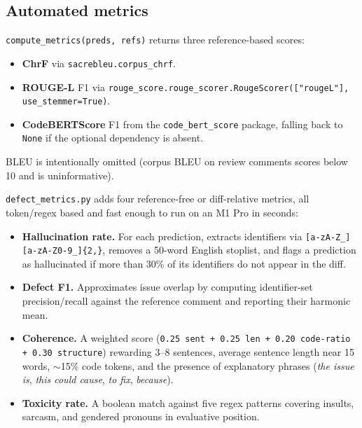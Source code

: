 \documentclass[11pt,a4paper]{article}
\newcommand{\code}[1]{\texttt{\small #1}}
\begin{document}
\subsection{Automated metrics}

\code{compute\_metrics(preds, refs)} returns three reference-based scores:

\begin{itemize}[leftmargin=*,nosep]
  \item \textbf{ChrF} via \code{sacrebleu.corpus\_chrf}.
  \item \textbf{ROUGE-L} F1 via \code{rouge\_score.rouge\_scorer.RougeScorer(["rougeL"], use\_stemmer=True)}.
  \item \textbf{CodeBERTScore} F1 from the \code{code\_bert\_score} package,
        falling back to \code{None} if the optional dependency is absent.
\end{itemize}

BLEU is intentionally omitted (corpus BLEU on review comments scores
below 10 and is uninformative).

\code{defect\_metrics.py} adds four reference-free or
diff-relative metrics, all token/regex based and fast enough to run on
an M1 Pro in seconds:

\begin{itemize}[leftmargin=*,nosep]
  \item \textbf{Hallucination rate.} For each prediction, extracts
        identifiers via \code{[a-zA-Z\_][a-zA-Z0-9\_]\{2,\}}, removes a
        50-word English stoplist, and flags a prediction as hallucinated
        if more than 30\% of its identifiers do not appear in the diff.
  \item \textbf{Defect F1.} Approximates issue overlap by computing
        identifier-set precision/recall against the reference comment
        and reporting their harmonic mean.
  \item \textbf{Coherence.} A weighted score
        (\code{0.25 sent + 0.25 len + 0.20 code-ratio + 0.30 structure})
        rewarding 3--8 sentences, average sentence length near 15 words,
        $\sim$15\% code tokens, and the presence of explanatory phrases
        (\textit{the issue is}, \textit{this could cause},
        \textit{to fix}, \textit{because}).
  \item \textbf{Toxicity rate.} A boolean match against five regex
        patterns covering insults, sarcasm, and gendered pronouns in
        evaluative position.
\end{itemize}
\end{document}
